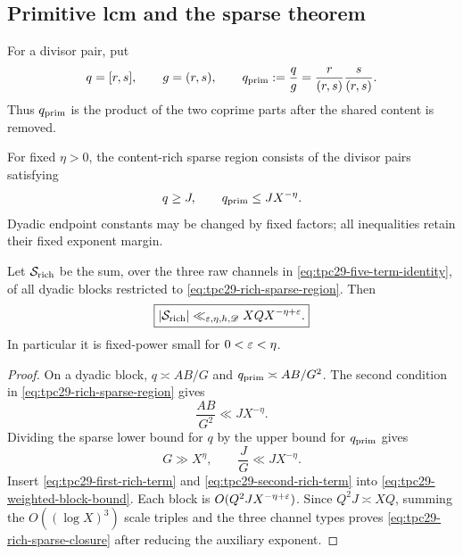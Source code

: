 \subsection{Primitive lcm and the sparse theorem}

For a divisor pair, put
\begin{equation}
 q=[r,s],\qquad g=(r,s),\qquad
 q_{\rm prim}:=\frac qg
 =\frac r{(r,s)}\frac s{(r,s)}.
 \label{eq:tpc29-primitive-lcm}
\end{equation}
Thus $q_{\rm prim}$ is the product of the two coprime parts after the
shared content is removed.

\begin{definition}
\label{def:tpc29-rich-sparse}
For fixed $\eta>0$, the content-rich sparse region consists of the
divisor pairs satisfying
\begin{equation}
 q\ge J,
 \qquad
 q_{\rm prim}\le JX^{-\eta}.
 \label{eq:tpc29-rich-sparse-region}
\end{equation}
Dyadic endpoint constants may be changed by fixed factors; all
inequalities retain their fixed exponent margin.
\end{definition}

\begin{theorem}
\label{thm:tpc29-rich-sparse}
Let $\mathcal S_{\rm rich}$ be the sum, over the three raw channels in
\eqref{eq:tpc29-five-term-identity}, of all dyadic blocks restricted to
\eqref{eq:tpc29-rich-sparse-region}.  Then
\begin{equation}
 \boxed{
 |\mathcal S_{\rm rich}|
 \ll_{\varepsilon,\eta,h,\mathscr D}
 XQX^{-\eta+\varepsilon}.}
 \label{eq:tpc29-rich-sparse-closure}
\end{equation}
In particular it is fixed-power small for $0<\varepsilon<\eta$.
\end{theorem}

\begin{proof}
On a dyadic block, $q\asymp AB/G$ and
$q_{\rm prim}\asymp AB/G^2$.  The second condition in
\eqref{eq:tpc29-rich-sparse-region} gives
\begin{equation}
 \frac{AB}{G^2}\ll JX^{-\eta}.
 \label{eq:tpc29-first-rich-term}
\end{equation}
Dividing the sparse lower bound for $q$ by the upper bound for
$q_{\rm prim}$ gives
\begin{equation}
 G\gg X^\eta,
 \qquad
 \frac JG\ll JX^{-\eta}.
 \label{eq:tpc29-second-rich-term}
\end{equation}
Insert \eqref{eq:tpc29-first-rich-term} and
\eqref{eq:tpc29-second-rich-term} into
\eqref{eq:tpc29-weighted-block-bound}.  Each block is
$O(Q^2JX^{-\eta+\varepsilon})$.  Since $Q^2J\asymp XQ$, summing the
$O((\log X)^3)$ scale triples and the three channel types proves
\eqref{eq:tpc29-rich-sparse-closure} after reducing the auxiliary
exponent.
\end{proof}

